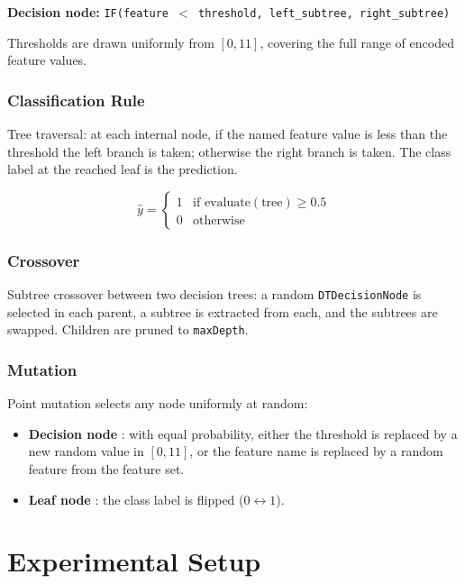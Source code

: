 \documentclass[12pt,a4paper]{article}
\begin{document}
\textbf{Decision node:} \texttt{IF(feature $<$ threshold, left\_subtree, right\_subtree)}

Thresholds are drawn uniformly from $[0, 11]$, covering the full range of encoded feature values.

\subsubsection{Classification Rule}

Tree traversal: at each internal node, if the named feature value is less than the threshold the left branch is taken; otherwise the right branch is taken. The class label at the reached leaf is the prediction.

\[
\hat{y} =
\begin{cases}
1 & \text{if } \mathrm{evaluate}(\text{tree}) \geq 0.5 \\
0 & \text{otherwise}
\end{cases}
\]

\subsubsection{Crossover}

Subtree crossover between two decision trees: a random \texttt{DTDecisionNode} is selected in each parent, a subtree is extracted from each, and the subtrees are swapped. Children are pruned to \texttt{maxDepth}.

\subsubsection{Mutation}

Point mutation selects any node uniformly at random:
\begin{itemize}
    \item \textbf{Decision node} : with equal probability, either the threshold is replaced by a new random value in $[0, 11]$, or the feature name is replaced by a random feature from the feature set.
    \item \textbf{Leaf node} : the class label is flipped ($0 \leftrightarrow 1$).
\end{itemize}

\section{Experimental Setup}
\end{document}

